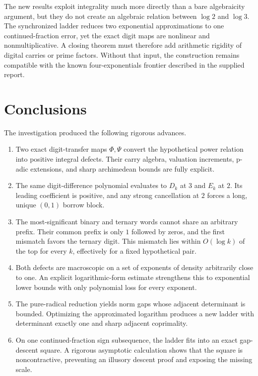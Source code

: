 \documentclass[11pt]{article}
\theoremstyle{definition}
\begin{document}
The new results exploit integrality much more directly than a bare
algebraicity argument, but they do not create an algebraic relation between
\(\log2\) and \(\log3\).  The synchronized ladder reduces two exponential
approximations to one continued-fraction error, yet the exact digit maps are
nonlinear and nonmultiplicative.  A closing theorem must therefore add
arithmetic rigidity of digital carries or prime factors.  Without that
input, the construction remains compatible with the known
four-exponentials frontier described in the supplied report.

\section{Conclusions}
\label{sec:conclusion}

The investigation produced the following rigorous advances.

\begin{enumerate}
\item Two exact digit-transfer maps \(\Phi,\Psi\) convert the hypothetical
power relation into positive integral defects.  Their carry algebra,
valuation increments, p-adic extensions, and sharp archimedean bounds are
fully explicit.

\item The same digit-difference polynomial evaluates to \(D_k\) at \(3\)
and \(E_k\) at \(2\).  Its leading coefficient is positive, and any strong
cancellation at \(2\) forces a long, unique \((0,1)\) borrow block.

\item The most-significant binary and ternary words cannot share an
arbitrary prefix.  Their common prefix is only \(1\) followed by zeros, and
the first mismatch favors the ternary digit.  This mismatch lies within
\(O(\log k)\) of the top for every \(k\), effectively for a fixed
hypothetical pair.

\item Both defects are macroscopic on a set of exponents of density
arbitrarily close to one.  An explicit logarithmic-form estimate strengthens
this to exponential lower bounds with only polynomial loss for every
exponent.

\item The pure-radical reduction yields norm gaps whose adjacent determinant
is bounded.  Optimizing the approximated logarithm produces a new ladder
with determinant exactly one and sharp adjacent coprimality.

\item On one continued-fraction sign subsequence, the ladder fits into an
exact gap-descent square.  A rigorous asymptotic calculation shows that the
square is noncontractive, preventing an illusory descent proof and exposing
the missing scale.
\end{enumerate}
\end{document}

